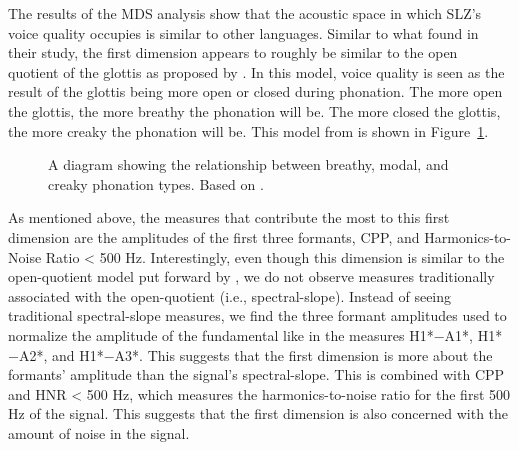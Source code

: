 The results of the MDS analysis show that the acoustic space in which SLZ's voice quality occupies is similar to other languages. Similar to what \citet{keatingCrosslanguageAcousticSpace2023} found in their study, the first dimension appears to roughly be similar to the open quotient of the glottis as proposed by \citet{gordonPhonationTypesCrosslinguistic2001}. In this model, voice quality is seen as the result of the glottis being more open or closed during phonation. The more open the glottis, the more breathy the phonation will be. The more closed the glottis, the more creaky the phonation will be. This model from \citet{gordonPhonationTypesCrosslinguistic2001} is shown in Figure~\ref{fig:phonation_types}.

\begin{figure}[h!]
    \centering
    \caption{A diagram showing the relationship between breathy, modal, and creaky phonation types. Based on \citet{gordonPhonationTypesCrosslinguistic2001}.}
    \label{fig:phonation_types}
\end{figure}

As mentioned above, the measures that contribute the most to this first dimension are the amplitudes of the first three formants, CPP, and Harmonics-to-Noise Ratio < 500 Hz. Interestingly, even though this dimension is similar to the open-quotient model put forward by \citet{gordonPhonationTypesCrosslinguistic2001}, we do not observe measures traditionally associated with the open-quotient (i.e., spectral-slope). Instead of seeing traditional spectral-slope measures, we find the three formant amplitudes used to normalize the amplitude of the fundamental like in the measures H1*$-$A1*, H1*$-$A2*, and H1*$-$A3*. This suggests that the first dimension is more about the formants' amplitude than the signal's spectral-slope. This is combined with CPP and HNR < 500 Hz, which measures the harmonics-to-noise ratio for the first 500 Hz of the signal. This suggests that the first dimension is also concerned with the amount of noise in the signal.

